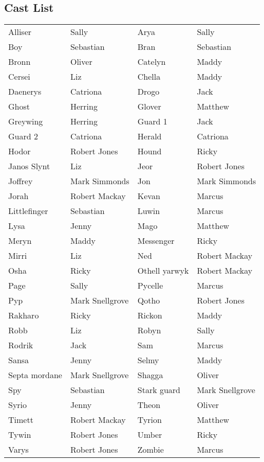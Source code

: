 \subsection*{Cast List}
\begin{tabular}{ll|ll}\\
Alliser & Sally &  Arya & Sally\\
Boy & Sebastian &  Bran & Sebastian\\
Bronn & Oliver &  Catelyn & Maddy\\
Cersei & Liz &  Chella & Maddy\\
Daenerys & Catriona &  Drogo & Jack\\
Ghost & Herring &  Glover & Matthew\\
Greywing & Herring &  Guard 1 & Jack\\
Guard 2 & Catriona &  Herald & Catriona\\
Hodor & Robert Jones &  Hound & Ricky\\
Janos Slynt & Liz &  Jeor & Robert Jones\\
Joffrey & Mark Simmonds &  Jon & Mark Simmonds\\
Jorah & Robert Mackay &  Kevan & Marcus\\
Littlefinger & Sebastian &  Luwin & Marcus\\
Lysa & Jenny &  Mago & Matthew\\
Meryn & Maddy &  Messenger & Ricky\\
Mirri & Liz &  Ned & Robert Mackay\\
Osha & Ricky &  Othell yarwyk & Robert Mackay\\
Page & Sally &  Pycelle & Marcus\\
Pyp & Mark Snellgrove &  Qotho & Robert Jones\\
Rakharo & Ricky &  Rickon & Maddy\\
Robb & Liz &  Robyn & Sally\\
Rodrik & Jack &  Sam & Marcus\\
Sansa & Jenny &  Selmy & Maddy\\
Septa mordane & Mark Snellgrove &  Shagga & Oliver\\
Spy & Sebastian &  Stark guard & Mark Snellgrove\\
Syrio & Jenny &  Theon & Oliver\\
Timett & Robert Mackay &  Tyrion & Matthew\\
Tywin & Robert Jones &  Umber & Ricky\\
Varys & Robert Jones &  Zombie & Marcus\\
\end{tabular}
